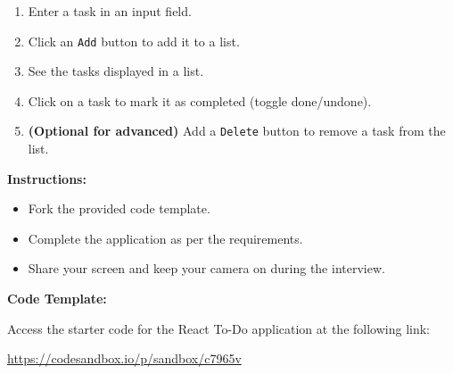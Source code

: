 \documentclass[12pt]{article}
\begin{document}
\begin{enumerate}[label=\arabic*.]
    \item Enter a task in an input field.
    \item Click an \texttt{Add} button to add it to a list.
    \item See the tasks displayed in a list.
    \item Click on a task to mark it as completed (toggle done/undone).
    \item \textbf{(Optional for advanced)} Add a \texttt{Delete} button to remove a task from the list.
\end{enumerate}

\textbf{Instructions:}

\begin{itemize}
    \item Fork the provided code template.
    \item Complete the application as per the requirements.
    \item Share your screen and keep your camera on during the interview.
\end{itemize}

\textbf{Code Template:}

Access the starter code for the React To-Do application at the following link:

\href{https://codesandbox.io/p/sandbox/c7965v}{https://codesandbox.io/p/sandbox/c7965v}


\end{document}
